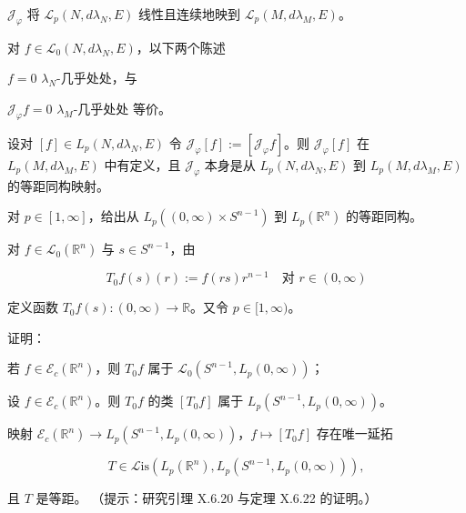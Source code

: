 \begin{exercises}
\begin{items}
$ \mathcal{J}_{\varphi} $ 将 $ \mathcal{L}_{p}(N,d\lambda_{N},E) $ 线性且连续地映到 $ \mathcal{L}_{p}(M,d\lambda_{M},E) $。

\item

对 $ f\in\mathcal{L}_{0}(N,d\lambda_{N},E) $，以下两个陈述

\begin{subitems}
\item

$ f=0 $ $ \lambda_{N} $-几乎处处，与

\item

$ \mathcal{J}_{\varphi}f=0 $ $ \lambda_{M} $-几乎处处
等价。

\end{subitems}

\item

设对 $ [f]\in L_{p}(N,d\lambda_{N},E) $ 令 $ \mathcal{J}_{\varphi}[f]:=[\mathcal{J}_{\varphi}f] $。则 $ \mathcal{J}_{\varphi}[f] $ 在 $ L_{p}(M,d\lambda_{M},E) $ 中有定义，且 $ \mathcal{J}_{\varphi} $ 本身是从 $ L_{p}(N,d\lambda_{N},E) $ 到 $ L_{p}(M,d\lambda_{M},E) $ 的等距同构映射。

\end{items}

\item

对 $ p\in[1,\infty] $，给出从 $ L_{p}((0,\infty)\times S^{n-1}) $ 到 $ L_{p}(\mathbb{R}^{n}) $ 的等距同构。

\item

对 $ f\in\mathcal{L}_{0}(\mathbb{R}^{n}) $ 与 $ s\in S^{n-1} $，由

\[
T_{0}f(s)(r):=f(rs)r^{n-1}\quad \text{对 } r\in(0,\infty)
\]

定义函数 $ T_{0}f(s):(0,\infty)\to\mathbb{R} $。又令 $ p\in[1,\infty) $。

证明：

\begin{items}
\item

若 $ f\in\mathcal{E}_{c}(\mathbb{R}^{n}) $，则 $ T_{0}f $ 属于 $ \mathcal{L}_{0}\left(S^{n-1},L_{p}(0,\infty)\right) $；

\item

设 $ f\in\mathcal{E}_{c}(\mathbb{R}^{n}) $。则 $ T_{0}f $ 的类 $ [T_{0}f] $ 属于 $ L_{p}\left(S^{n-1},L_{p}(0,\infty)\right) $。

\item

映射 $ \mathcal{E}_{c}(\mathbb{R}^{n})\to L_{p}\left(S^{n-1},L_{p}(0,\infty)\right) $，$ f\mapsto[T_{0}f] $ 存在唯一延拓

\[
T\in\mathcal{L}\mathrm{is}\left(L_{p}(\mathbb{R}^{n}),L_{p}\left(S^{n-1},L_{p}(0,\infty)\right)\right),
\]

且 $ T $ 是等距。
（提示：研究引理 X.6.20 与定理 X.6.22 的证明。）

\end{items}

\end{exercises}

